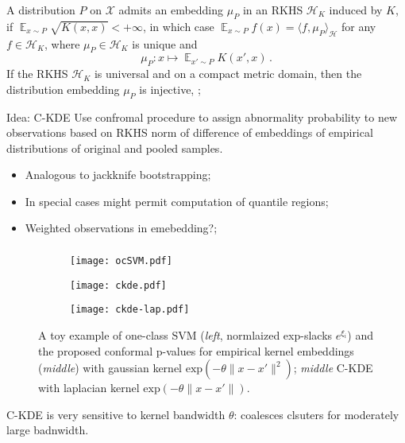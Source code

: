 \documentclass[t]{beamer}  %
\newcommand{\Xcal}{\mathcal{X}}
\newcommand{\Hcal}{\mathcal{H}}
\newcommand{\ex}{\mathop{\mathbb{E}}\nolimits}
\begin{document}
\begin{frame}[c]\frametitle{\insertsection}
  \framesubtitle{\insertsubsection}
  A distribution $P$ on $\Xcal$ admits an embedding $\mu_P$ in an RKHS $\Hcal_K$
  induced by $K$, if $\ex_{x\sim P} \sqrt{K(x,x)} < +\infty$, in which case
  $\ex_{x\sim P} f(x) = \langle f, \mu_P \rangle_\Hcal $ for any $f\in \Hcal_K$,
  where $\mu_P\in \Hcal_K$ is unique and
  $$ \mu_P: x \mapsto \ex_{x'\sim P} K(x', x) \,. $$
  If the RKHS $\Hcal_K$ is universal and on a compact metric domain, then the
  distribution embedding $\mu_P$ is injective, \cite{gretton2012};

  \begin{block}{Idea: C-KDE}
    Use confromal procedure to assign abnormality probability to new observations
    based on RKHS norm of difference of embeddings of empirical distributions of
    original and pooled samples.
    \begin{itemize}
      \item Analogous to jackknife bootstrapping;
      \item In special cases might permit computation of quantile regions;
      \item Weighted observations in emebedding?;
    \end{itemize}
  \end{block}
\end{frame}

\begin{frame}[c, shrink=0]\frametitle{\insertsection}
  \framesubtitle{\insertsubsection}
  \begin{figure}%
    \centering
    \begin{subfigure}[b]{0.33\linewidth}
      \texttt{[image: ocSVM.pdf]}
    \end{subfigure}%
    \begin{subfigure}[b]{0.33\linewidth}
      \texttt{[image: ckde.pdf]}
    \end{subfigure}%
    \begin{subfigure}[b]{0.33\linewidth}
      \texttt{[image: ckde-lap.pdf]}
    \end{subfigure}%
    \caption{A toy example of one-class SVM (\textit{left}, normlaized exp-slacks
    $e^{\xi_i}$) and the proposed conformal p-values for empirical kernel embeddings
    (\textit{middle}) with gaussian kernel $\text{exp}(-\theta\|x-x'\|^2)$;
    \textit{middle} C-KDE with laplacian kernel $\text{exp}(-\theta\|x-x'\|)$.}
    \label{fig:gauss_1d_prof_gpr}
  \end{figure}
  C-KDE is very sensitive to kernel bandwidth $\theta$: coalesces clsuters for
  moderately large badnwidth.
\end{frame}
\end{document}

